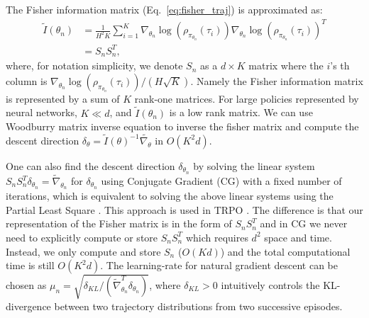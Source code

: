 \documentclass{article}
\newcommand{\wen}[1]{\textcolor{green}{\bf Wen: {#1}}}
\begin{document}
The Fisher information matrix (Eq.~\ref{eq:fisher_traj}) is approximated as:
\begin{align}
\tilde{I}(\theta_n) &= \frac{1}{H^2K}\sum_{i=1}^K \nabla_{\theta_n}\log(\rho_{\pi_{\theta_n}}(\tau_i))\nabla_{\theta_n}\log(\rho_{\pi_{\theta_n}}(\tau_i))^T \nonumber\\
& = S_n S_n^T,
\end{align} where, for notation simplicity, we denote $S_n$ as a $d\times K$ matrix where the $i$'s th column is $\nabla_{\theta_n}\log(\rho_{\pi_{\theta_n}}(\tau_i))/(H\sqrt{K})$. Namely the Fisher information matrix is represented by a sum of $K$ rank-one matrices. For large policies represented by neural networks, $K\ll d$, and $\tilde{I}(\theta_n)$ is a low rank matrix. We can use Woodburry matrix inverse equation to inverse the fisher matrix and compute the descent direction $\delta_{\theta} = \tilde{I}(\theta)^{-1}\tilde{\nabla_{\theta}}$ in $O(K^2 d)$.



One can also find the descent direction $\delta_{\theta_n}$ by solving the linear system $S_nS_n^T \delta_{\theta_n} = \tilde{\nabla}_{\theta_n}$ for $\delta_{\theta_n}$ using Conjugate Gradient (CG) with a fixed number of iterations, which is equivalent to solving the above linear systems using the Partial Least Square \cite{phatak2002exploiting}. This approach is used in TRPO \cite{schulman2015trust}. The difference is that our representation of the Fisher matrix is in the form of $S_nS_n^T$ and in CG we never need to explicitly compute or store $S_nS_n^T$ which requires $d^2$ space and time. Instead, we only compute and store $S_n$ ($O(Kd)$) and the total computational time is still $O(K^2 d)$. The learning-rate for natural gradient descent can be chosen as $\mu_n = \sqrt{\delta_{KL}/(\tilde{\nabla}_{\theta_n}^T\delta_{\theta_n})}$, where $\delta_{KL}>0$ intuitively controls the KL-divergence between two trajectory distributions from two successive episodes. 
\end{document}
